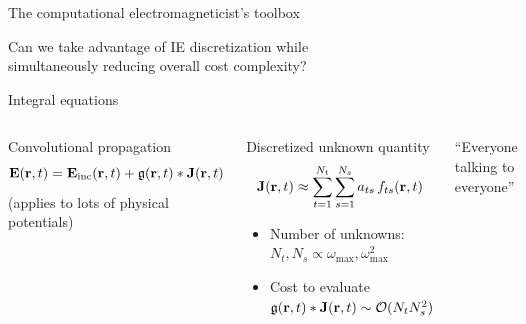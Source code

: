 \documentclass[aspectratio=169, usenames, dvipsnames]{beamer}
\begin{document}
\begin{frame}{The computational electromagneticist's toolbox}
  \begin{center}
    
    \vspace{-0.5cm}
    Can we take advantage of IE discretization while \\ simultaneously reducing overall cost complexity?
  \end{center}
\end{frame}

\begin{frame}{Integral equations}
  \begin{columns}
    \begin{block}{Convolutional propagation}
      \begin{equation*}
        \vb{E}(\vb{r}, t) = \vb{E}_\text{inc}(\vb{r}, t) + \mathfrak{g}(\vb{r}, t) * \vb{J}(\vb{r}, t)
      \end{equation*}
      \hfill \tiny{(applies to lots of physical potentials)}
    \end{block}

    \begin{block}{Discretized unknown quantity}
      \begin{equation*}
        \vb{J}(\vb{r}, t) \approx \sum_{t=1}^{N_t} \sum_{s=1}^{N_s} a_{ts} \, f_{ts}(\vb{r}, t)
      \end{equation*}
      \begin{itemize}
        \item Number of unknowns: $N_t, N_s \propto \omega_\text{max}, \omega_\text{max}^2$
        \item Cost to evaluate $\mathfrak{g}(\vb{r}, t) * \vb{J}(\vb{r}, t) \sim \mathcal{O}(N_t N_s^2)$
      \end{itemize}
    \end{block}

      \begin{center}
        
        {\small ``Everyone talking to everyone''}
      \end{center}
  \end{columns}
\end{frame}
\end{document}
